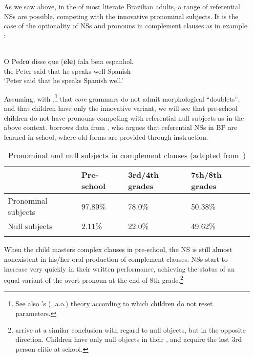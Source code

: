 \documentclass[output=paper]{langsci/langscibook}
\begin{document}
As we saw above, in the  of most literate Brazilian adults, a range
of referential NSs are possible, competing with the innovative pronominal
subjects. It is the case of the optionality of NSs and pronouns in complement
clauses as in example :

\ea%
    \label{ex:15/2}\\
	\gll	O Pedr\textbf{o} disse que (\textbf{ele}) fala bem     espanhol.\\
            the Peter said that \hphantom{(}he speaks well  Spanish\\
	\glt	\enquote*{Peter said that  he speaks Spanish well.}
\z

Assuming, with \citet{Kato2011},\footnote{See also \citeauthor{Dresher1999}'s
(\citeyear{Dresher1999}, a.o.) theory according to which children do not reset
parameters.} that \emph{core} grammars do not admit morphological “doublets”,
and that children have only the innovative variant, we will see that pre-school
children do not have pronouns competing with referential null subjects as in
the above context. \citeauthor{Kato2011} borrows data from
\textcite{Magalhaes2003}, who argues that referential NSs in
\gls{BP} are learned in school, where old forms are
provided through instruction.\largerpage[1]

\begin{table}[htpb]
    \centering
    \begin{tabularx}{\textwidth}{lXXX}
    \lsptoprule
                         & Pre-school & 3rd/4th grades & 7th/8th grades\\
    \midrule
    Pronominal subjects & 97.89\%    & 78.0\%         & 50.38\%\\
    Null subjects       & 2.11\%     & 22.0\%         & 49.62\%\\
    \lspbottomrule
    \end{tabularx}
    \caption{Pronominal and null subjects in complement clauses (adapted
    from~\citealt{Magalhaes2003})}\label{tab:26.2}
\end{table}

When the child masters complex clauses in pre-school, the NS is still almost
nonexistent in his/her oral production of complement clauses. NSs start to
increase very quickly in their written performance, achieving the status of an
equal variant of the overt pronoun at the end of 8th
grade.\footnote{\citet{KatoEtAl2009} arrive at a similar conclusion
    with regard to null objects, but in the opposite direction. Children have
    only null objects in their , and acquire the lost 3rd person
clitic at school.}
\end{document}
